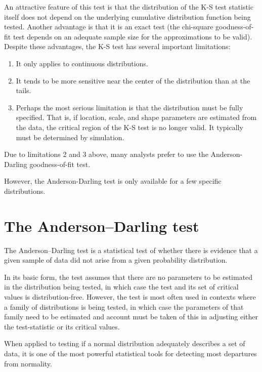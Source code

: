 An attractive feature of this test is that the distribution of the K-S test statistic itself does not depend on the underlying cumulative distribution function being tested. Another advantage is that it is an exact test (the chi-square goodness-of-fit test depends on an adequate sample size for the approximations to be valid). Despite these advantages, the K-S test has several important limitations:
\begin{enumerate}
	\item It only applies to continuous distributions.
	\item It tends to be more sensitive near the center of the distribution than at the tails.
	\item Perhaps the most serious limitation is that the distribution must be fully specified. That is, if location, scale, and shape parameters are estimated from the data, the critical region of the K-S test is no longer valid. It typically must be determined by simulation.
\end{enumerate}
Due to limitations 2 and 3 above, many analysts prefer to use the Anderson-Darling goodness-of-fit test.

However, the Anderson-Darling test is only available for a few specific distributions.

\section{The Anderson–Darling test}

The Anderson–Darling test is a statistical test of whether there is evidence that a given sample of data did not arise from a given probability distribution.

In its basic form, the test assumes that there are no parameters to be estimated in the distribution being tested, in which case the test and its set of critical values is distribution-free. However, the test is most often used in contexts where a family of distributions is being tested, in which case the parameters of that family need to be estimated and account must be taken of this in adjusting either the test-statistic or its critical values.

When applied to testing if a normal distribution adequately describes a set of data, it is one of the most powerful statistical tools for detecting most departures from normality.

